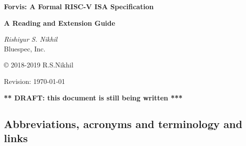 \documentclass[11pt]{article}
\begin{document}

\pagestyle{empty}

\begin{center}

\vspace*{1.5in}

{\LARGE\bf Forvis: A Formal RISC-V ISA Specification}

\vspace{1cm}

{\large\bf A Reading and Extension Guide}

\vspace{2cm}

{\Large \emph{Rishiyur S. Nikhil}} \\

Bluespec, Inc.


\vspace{0.5in}

\copyright{} 2018-2019 R.S.Nikhil

\vspace{1in}

Revision: \today

\vspace{1in}

{\Large\bf *** DRAFT: this document is still being written ***}

\end{center}


\newpage



\subsection*{Abbreviations, acronyms and terminology and links}
\end{document}
